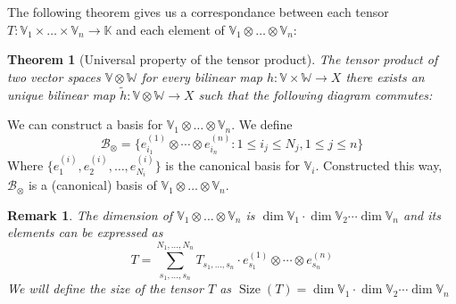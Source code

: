 \documentclass[11pt,a4paper,openright,oneside]{book}
\numberwithin{equation}{section}
\newtheorem{thm0}[defn0]{Theorem}
\newtheorem{remark0}[defn0]{Remark}
\newenvironment{theorem}{\bigskip \begin{thm0}}{\end{thm0}}
\newenvironment{remark}{ \begin{remark0}\rm}{\end{remark0}}
\DeclareMathOperator{\size}{Size}
\begin{document}
The following theorem gives us a correspondance between each tensor ${T: \mathbb{V}_1 \times \dots \times \mathbb{V}_n \rightarrow \mathbb{K}}$
and each element of $\mathbb{V}_1 \otimes \dots \otimes \mathbb{V}_n$:

\begin{theorem}[Universal property of the tensor product]
    The tensor product of two vector spaces $\mathbb{V} \otimes \mathbb{W}$
    for every bilinear map $h: \mathbb{V} \times \mathbb{W} \rightarrow X$ there exists an unique bilinear map $\tilde{h}: \mathbb{V} \otimes
    \mathbb{W} \rightarrow X$ such that the following diagram commutes:

    \centering

\end{theorem}

We can construct a basis for $\mathbb{V}_1 \otimes \dots \otimes \mathbb{V}_n$. We define
$$\mathcal{B}_{\otimes} = \{e_{i_1}^{(1)} \otimes \cdots \otimes e_{i_n}^{(n)} : 1 \leqslant i_j \leqslant N_j, 1 \leqslant j \leqslant n\}$$
Where $\{e_1^{(i)}, e_2^{(i)}, \dots, e_{N_i}^{(i)}\}$ is the canonical basis for $\mathbb{V}_i$.
Constructed this way, $\mathcal{B}_\otimes$ is a (canonical) basis of ${\mathbb{V}_1 \otimes \dots \otimes \mathbb{V}_n}$.

\begin{remark} \label{rem:tenbase} The dimension
    of ${\mathbb{V}_1 \otimes \dots \otimes \mathbb{V}_n}$ is ${\dim{\mathbb{V}_1} \cdot \dim{\mathbb{V}_2} \cdots \dim{\mathbb{V}_n}}$ and its elements can be expressed as
    \begin{equation} \label{eq:base-representation}
T = \sum_{s_1, \dots, s_n}^{N_1, \dots, N_n} T_{s_1, \dots, s_n} \cdot  e_{s_1}^{(1)} \otimes \cdots \otimes e_{s_n}^{(n)}
\end{equation}
We will define the size of the tensor $T$ as $\size(T) = \dim \mathbb{V}_1 \cdot \dim \mathbb{V}_2 \cdots \dim \mathbb{V}_n$
\end{remark}
\end{document}
